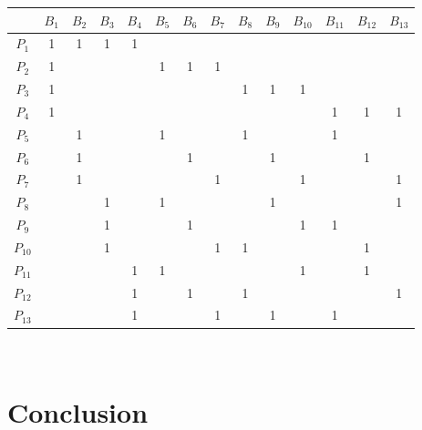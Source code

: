 \documentclass[12pt]{article}
\begin{document}
\begin{tabular}{|c|c|c|c|c|c|c|c|c|c|c|c|c|c|}
\hline
   &$B_1$&$B_2$&$B_3$&$B_4$&$B_5$&$B_6$&$B_7$&$B_8$&$B_9$&$B_{10}$&$B_{11}$&$B_{12}$&$B_{13}$\\
\hline
$P_1$&1&1&1&1& & & & & & & & & \\
\hline
$P_2$&1& & & &1&1&1& & & & & & \\
\hline
$P_3$&1& & & & & & &1&1&1& & & \\
\hline
$P_4$&1& & & & & & & & & &1&1&1\\
\hline
$P_5$& &1& & &1& & &1& & &1& & \\
\hline
$P_6$& &1& & & &1& & &1& & &1& \\
\hline
$P_7$& &1& & & & &1& & &1& & &1\\
\hline
$P_8$& & &1& &1& & & &1& & & &1\\
\hline
$P_9$& & &1& & &1& & & &1&1& & \\
\hline
$P_{10}$& & &1& & & &1&1& & & &1& \\
\hline
$P_{11}$& & & &1&1& & & & &1& &1& \\
\hline
$P_{12}$& & & &1& &1& &1& & & & &1\\
\hline
$P_{13}$& & & &1& & &1& &1& &1& & \\
\hline
\end{tabular} \\

\section{Conclusion}
\end{document}
